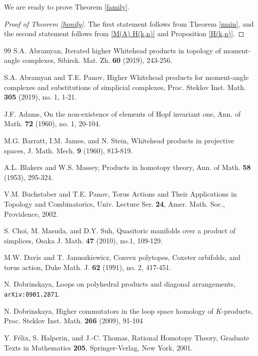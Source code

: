 \documentclass[a4paper]{amsart}
\numberwithin{equation}{section}
\theoremstyle{definition}
\theoremstyle{remark}
\numberwithin{equation}{section}
\begin{document}
We are ready to prove Theorem \ref{family}.



\begin{proof}
  [Proof of Theorem \ref{family}]
  The first statement follows from Theorem \ref{main}, and the second statement follows from \eqref{M(A) H(k,n)} and Proposition \ref{H(k,n)}.
\end{proof}



\begin{thebibliography}{99}
   S.A. Abramyan, Iterated higher Whitehead products in topology of moment-angle complexes, Sibirsk. Mat. Zh. \textbf{60} (2019), 243-256.

   S.A. Abramyan and T.E. Panov, Higher Whitehead products for moment-angle complexes and substitutions of simplicial complexes, Proc. Steklov Inst. Math. \textbf{305} (2019), no. 1, 1-21.

   J.F. Adams, On the non-existence of elements of Hopf invariant one, Ann. of Math. \textbf{72} (1960), no. 1, 20-104.

   M.G. Barratt, I.M. James, and N. Stein, Whitehead products in projective spaces, J. Math. Mech. \textbf{9} (1960), 813-819.

   A.L. Blakers and W.S. Massey, Products in homotopy theory, Ann. of Math. \textbf{58} (1953), 295-324.

   V.M. Buchstaber and T.E. Panov, Torus Actions and Their Applications in Topology and Combinatorics, Univ. Lecture Ser. \textbf{24}, Amer. Math. Soc., Providence, 2002.

   S. Choi, M. Masuda, and D.Y. Suh, Quasitoric manifolds over a product of simplices, Osaka J. Math. \textbf{47} (2010), no.1, 109-129.

   M.W. Davis and T. Januszkiewicz, Convex polytopes, Coxeter orbifolds, and torus action, Duke Math. J. \textbf{62} (1991), no. 2, 417-451.

   N. Dobrinskaya, Loops on polyhedral products and diagonal arrangements, \texttt{arXiv:0901.2871}.

   N. Dobrinskaya, Higher commutators in the loop space homology of $K$-products, Proc. Steklov Inst. Math. \textbf{266} (2009), 91-104

   Y. F\'{e}lix, S. Halperin, and J.-C. Thomas, Rational Homotopy Theory, Graduate Texts in Mathematics \textbf{205}, Springer-Verlag, New York, 2001.


\end{thebibliography}
\end{document}
